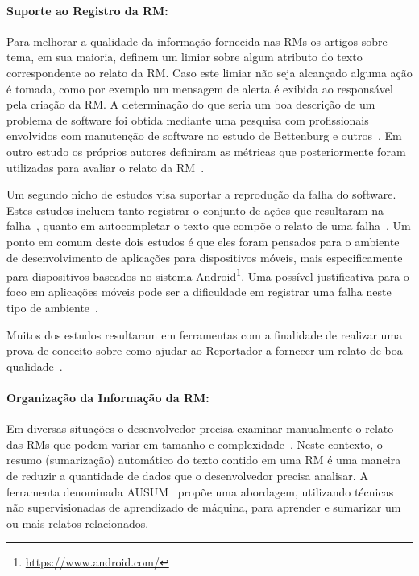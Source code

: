 \paragraph{Suporte ao Registro da RM:}

Para melhorar a qualidade da informação fornecida nas RMs os artigos sobre tema,
em sua maioria, definem um limiar sobre algum atributo do texto correspondente ao
relato da RM. Caso este limiar não seja alcançado alguma ação é tomada,  como
por exemplo um mensagem de alerta é exibida ao responsável pela criação da RM\@.
A determinação do que seria um boa descrição de um problema de software foi
obtida mediante uma pesquisa com profissionais envolvidos com manutenção de
software no estudo de Bettenburg e outros~\cite{Bettenburg2008a}. Em outro
estudo os próprios autores definiram as métricas que posteriormente foram
utilizadas para avaliar o relato da RM~\cite{Tu:2014:MQI:2677832.2677844}.

Um segundo nicho de estudos visa suportar a reprodução da falha do software.
Estes estudos incluem tanto registrar o conjunto de ações que resultaram na
falha~\cite{White:2015:GRR:2820282.2820291}, quanto em autocompletar o texto que
compõe o relato de uma falha~\cite{moran2015auto}. Um ponto em comum deste dois
estudos é que eles foram pensados para o ambiente de desenvolvimento de
aplicações para dispositivos móveis, mais especificamente para dispositivos
baseados no sistema Android\footnote{\url{https://www.android.com/}}. Uma
possível justificativa para o foco em aplicações móveis pode ser a dificuldade
em registrar uma falha neste tipo de
ambiente~\cite{White:2015:GRR:2820282.2820291, moran2015auto}.

Muitos dos estudos resultaram em ferramentas com a finalidade de realizar uma
prova de conceito sobre como ajudar ao Reportador a fornecer um relato de boa
qualidade~\cite{Tu:2014:MQI:2677832.2677844, Bettenburg2008a,
    Wu2011a,White:2015:GRR:2820282.2820291,moran2015auto}.

\paragraph{Organização da Informação da RM:}

Em diversas situações o desenvolvedor precisa examinar manualmente o relato das
RMs que podem variar em tamanho e complexidade~\cite{mani2012ausum}. Neste
contexto, o resumo (sumarização) automático do texto contido em uma RM é uma
maneira de reduzir a quantidade de dados que o desenvolvedor precisa analisar.
A ferramenta denominada AUSUM~\cite{mani2012ausum} propõe uma abordagem,
utilizando técnicas não supervisionadas de aprendizado de máquina, para aprender
e sumarizar um ou mais relatos relacionados.

